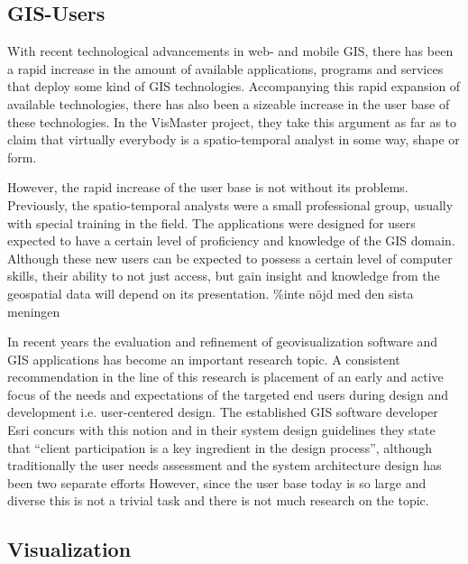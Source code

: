 \documentclass[a4paper,12pt,titlepage]{article}
\begin{document}
\newpage
\subsection{GIS-Users}

With recent technological advancements in web- and mobile GIS, there has been a rapid increase in the amount of available applications, programs and services that deploy some kind of GIS technologies. \citep{VisMaster} Accompanying this rapid expansion of available technologies, there has also been a sizeable increase in the user base of these technologies. In the VisMaster project, they take this argument as far as to claim that virtually everybody is a spatio-temporal analyst in some way, shape or form. \citep{VisMaster}

However, the rapid increase of the user base is not without its problems. Previously, the spatio-temporal analysts were a small professional group, usually with special training in the field. The applications were designed for users expected to have a certain level of proficiency and knowledge of the GIS domain. \citep[p. 83]{VisMaster} Although these new users can be expected to possess a certain level of computer skills, their ability to not just access, but gain insight and knowledge from the geospatial data will depend on its presentation. \%inte nöjd med den sista meningen

In recent years the evaluation and refinement of geovisualization software and GIS applications has become an important research topic. A consistent recommendation in the line of this research is placement of an early and active focus of the needs and expectations of the targeted end users during design and development i.e. user-centered design. \citep{CrimeAnalysis} The established GIS software developer Esri concurs with this notion and in their system design guidelines they state that “client participation is a key ingredient in the design process”, although traditionally the user needs assessment and the system architecture design has been two separate efforts \citep[pp. 1.4-6]{EsriReport} %
However, since the user base today is so large and diverse this is not a trivial task and there is not much research on the topic.



\subsection{Visualization}
\end{document}
